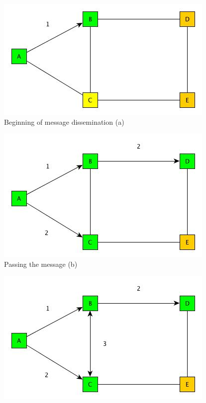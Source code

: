 \begin{figure}[h!]
   \begin{minipage}[t]{0.45\textwidth}
      \vspace{0pt}
      \includegraphics[width=\linewidth]{figures/network_gossip_1.jpg}
      Beginning of message dissemination (a)
   \end{minipage}
   \hfill
   \begin{minipage}[t]{0.45\textwidth}
      \vspace{0pt}
      \includegraphics[width=\linewidth]{figures/network_gossip_2.jpg}
      Passing the message (b)
   \end{minipage}
   \vspace{5ex}
     \begin{center}
     \begin{minipage}[c]{0.45\textwidth}
      \vspace{0pt}
      \includegraphics[width=\linewidth]{figures/network_gossip_3.jpg}

\end{minipage}
\end{center}
\end{figure}
